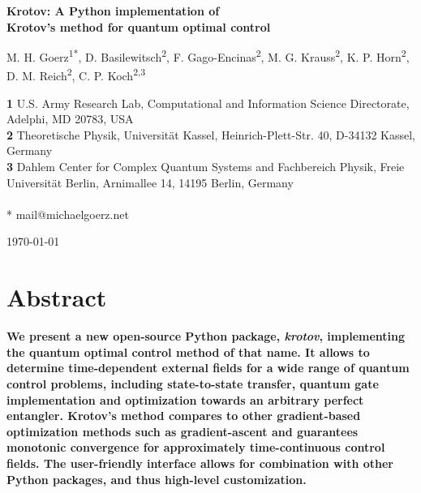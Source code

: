 \documentclass[submission, Phys]{SciPost}
\begin{document}
\begin{center}{\Large \textbf{%
    Krotov:
    A Python implementation of \\Krotov's method for quantum optimal control
}}\end{center}

\begin{center}
M. H. Goerz\textsuperscript{1*},
D. Basilewitsch\textsuperscript{2},
F. Gago-Encinas\textsuperscript{2},
M. G. Krauss\textsuperscript{2},
K. P. Horn\textsuperscript{2},
D. M. Reich\textsuperscript{2},
C. P. Koch\textsuperscript{2,3}
\end{center}

\begin{center}
{\bf 1} U.S. Army Research Lab, Computational and Information Science Directorate, Adelphi, MD 20783, USA
\\
{\bf 2} Theoretische Physik, Universität Kassel, Heinrich-Plett-Str. 40, D-34132 Kassel, Germany
\\
{\bf 3} Dahlem Center for Complex Quantum Systems and Fachbereich Physik, Freie Universität Berlin, Arnimallee 14, 14195 Berlin, Germany
\\~\\
* mail@michaelgoerz.net
\end{center}

\begin{center}
\today
\end{center}


\section*{Abstract}
{\bf
We present a new open-source Python package, \emph{krotov}, implementing
the quantum optimal control method of that name.
It allows to determine time-dependent external fields for a wide range of
quantum control problems, including state-to-state transfer, quantum gate
implementation and optimization towards an arbitrary perfect entangler.
Krotov's method compares to other gradient-based optimization methods
such as gradient-ascent and guarantees monotonic convergence for
approximately time-continuous control fields.
The user-friendly interface allows for combination with other Python packages,
and thus high-level customization.
}
\end{document}
